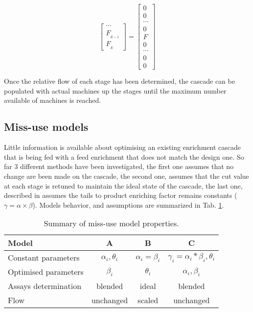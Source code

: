 \begin{equation}
\begin{bmatrix}
     \cdots     \\
     F_{_{E-1}} \\
     F_{_{E}}
 \end{bmatrix}
 =
 \begin{bmatrix}
     0      \\
     0      \\
     \cdots \\
     0      \\
     F      \\
     0      \\
     \cdots \\
     0      \\
     0
\end{bmatrix}
\label{eq:flow}
\end{equation}

Once the relative flow of each stage has been determined, the cascade can be
populated with actual machines up the stages until the maximum number available
of machines is reached.


\subsection{Miss-use models}
Little information is available about optimising an existing enrichment cascade
that is being fed with a feed enrichment that does not match the design one. So
far 3 different methods have been investigated, the first one assumes that no
change are been made on the cascade, the second one, assumes that the cut value
at each stage is retuned to maintain the ideal state of the cascade, the last
one, described in \cite{walker.2017} assumes the tails to product enriching
factor remains constants ($\gamma = \alpha\times\beta$). Models behavior, and
assumptions are summarized in Tab. \ref{tab:models}.

\begin{table}[htb]
\centering
  \caption{Summary of miss-use model properties.}
\begin{tabular}{l|ccc}
\toprule

Model                &    A                 & B                  & C  \\
\midrule
Constant parameters  & $\alpha_i, \theta_i$ & $\alpha_i=\beta_i$ & $\gamma_i=\alpha_i*\beta_i, \theta_i$       \\
Optimised parameters & $\beta_i$            & $\theta_i$         & $\alpha_i, \beta_i$                     \\
Assays determination & blended              & ideal              & blended                  \\
Flow                 & unchanged            & scaled             & unchanged       \\

\bottomrule
\end{tabular}
  \label{tab:models}
\end{table}

